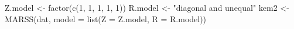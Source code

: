 \begin{Schunk}
\begin{Sinput}
 Z.model <- factor(c(1, 1, 1, 1, 1))
 R.model <- "diagonal and unequal"
 kem2 <- MARSS(dat, model = list(Z = Z.model, R = R.model))
\end{Sinput}
\end{Schunk}
